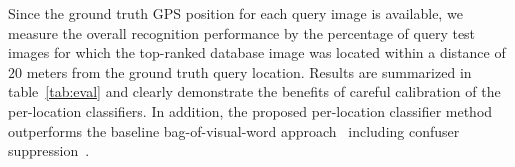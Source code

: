 
      

      Since the ground truth GPS position for each query image is available, we measure the overall recognition performance by the percentage of query test images for which the top-ranked database image was located within a distance of $20$ meters from the ground truth query location.  Results are summarized in table~\ref{tab:eval} and clearly demonstrate the benefits of  careful calibration of the per-location classifiers. In addition, the proposed per-location classifier method outperforms the baseline bag-of-visual-word approach~\cite{Philbin07} including confuser suppression~\cite{Knopp2010}.

